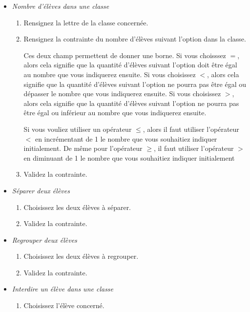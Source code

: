 \documentclass[11pt,a4paper]{article}
\begin{document}
\begin{enumerate}
\begin{itemize}
\begin{enumerate}
      \item Validez la contrainte.
    \end{enumerate}
    \item \textit{Nombre d'élèves dans une classe}
    \begin{enumerate}
      \item Rensignez la lettre de la classe concernée.
      \item Rensignez la contrainte du nombre d'élèves suivant l'option dans la classe.
      \begin{note} Ces deux champ permettent de donner une borne. Si vous choisssez $=$, alors cela signifie que la quantité d'élèves suivant l'option doit être égal au nombre que vous indiquerez ensuite. Si vous choisissez $<$, alors cela signifie que la quantité d'élèves suivant l'option ne pourra pas être égal ou dépasser le nombre que vous indiquerez ensuite. Si vous choisissez $>$, alors cela signifie que la quantité d'élèves suivant l'option ne pourra pas être égal ou inférieur au nombre que vous indiquerez ensuite.\end{note}\begin{astuce} Si vous vouliez utiliser un opérateur $\le$, alors il faut utiliser l'opérateur $<$ en incrémentant de 1 le nombre que vous souhaitiez indiquer initialement. De même pour l'opérateur $\ge$, il faut utiliser l'opérateur $>$ en diminuant de 1 le nombre que vous souhaitiez indiquer initialement\end{astuce}
      \item Validez la contrainte.
    \end{enumerate}
    \item \textit{Séparer deux élèves}
    \begin{enumerate}
      \item Choisissez les deux élèves à séparer.
      \item Validez la contrainte.
    \end{enumerate}
    \item \textit{Regrouper deux élèves}
    \begin{enumerate}
      \item Choisissez les deux élèves à regrouper.
      \item Validez la contrainte.
    \end{enumerate}
    \item \textit{Interdire un élève dans une classe}
    \begin{enumerate}
      \item Choisissez l'élève concerné.

\end{enumerate}
\end{itemize}
\end{enumerate}
\end{document}

